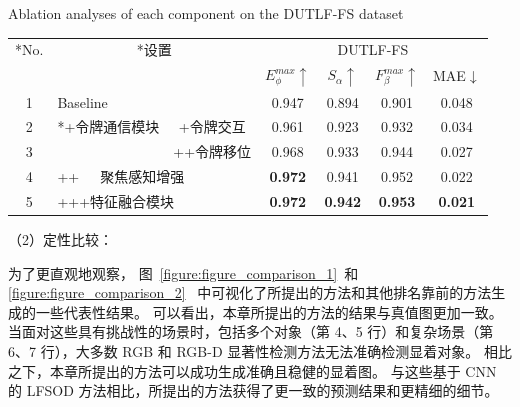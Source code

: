 \begin{table}[t]
	{Ablation analyses of each component on the DUTLF-FS dataset}
	\centering
	\label{table:abl_total}
	\label{chpt3:table:abl_total}
		\begin{tabular}{cllcccc}
			\toprule[2pt]  %
			
			\multicolumn{1}{c}{ \multirow{2}*{No.}} 
			& \multicolumn{2}{c}{ \multirow{2}*{设置}}	
			& \multicolumn{4}{c}{DUTLF-FS} \\
				
			\cmidrule(r){4-7} 
			
			& & & $E_{\phi}^{max}\uparrow$ & $S_{\alpha }\uparrow $ & $F_{\beta}^{max}\uparrow$ & MAE$\downarrow$ \\
			
	
			\midrule
	
			1 & \multicolumn{2}{l}{ Baseline }     & 0.947 & 0.894 & 0.901 & 0.048 \\ 
			
			
			\midrule
			
			2 & \multicolumn{1}{l}{ \multirow{2}*{+令牌通信模块}}	

			& \multicolumn{1}{c}{+令牌交互}  & 0.961 & 0.923 & 0.932 & 0.034 \\ 
			3 & & \multicolumn{1}{c}{++令牌移位} & 0.968 & 0.933 & 0.944 & 0.027 \\
			
			\midrule
			
			4 & \multicolumn{2}{l}{++~~~聚焦感知增强} 		
			& \textbf{0.972} & 0.941 & 0.952 & 0.022 \\
			
			5 & \multicolumn{2}{l}{+++特征融合模块} 		
			& \textbf{0.972} & \textbf{0.942} & \textbf{0.953} & \textbf{0.021} \\ 
			
			
			\bottomrule[2pt]
		\end{tabular}
\end{table}



（2）定性比较：


为了更直观地观察，
图~\ref{figure:figure_comparison_1}~和
\ref{figure:figure_comparison_2}~
中可视化了所提出的方法和其他排名靠前的方法生成的一些代表性结果。
可以看出，本章所提出的方法的结果与真值图更加一致。 当面对这些具有挑战性的场景时，包括多个对象（第 4、5 行）和复杂场景（第 6、7 行），大多数 RGB 和 RGB-D 显著性检测方法无法准确检测显着对象。
相比之下，本章所提出的方法可以成功生成准确且稳健的显着图。 与这些基于 CNN 的 LFSOD 方法相比，所提出的方法获得了更一致的预测结果和更精细的细节。








